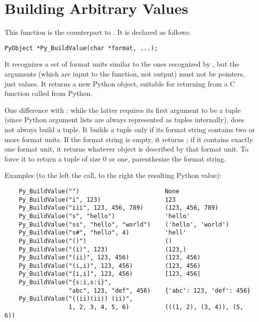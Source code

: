 \section{Building Arbitrary Values
         \label{buildValue}}

This function is the counterpart to .  It is
declared as follows:

\begin{verbatim}
PyObject *Py_BuildValue(char *format, ...);
\end{verbatim}

It recognizes a set of format units similar to the ones recognized by
, but the arguments (which are input to the
function, not output) must not be pointers, just values.  It returns a
new Python object, suitable for returning from a C function called
from Python.

One difference with : while the latter
requires its first argument to be a tuple (since Python argument lists
are always represented as tuples internally),
 does not always build a tuple.  It builds
a tuple only if its format string contains two or more format units.
If the format string is empty, it returns ; if it contains
exactly one format unit, it returns whatever object is described by
that format unit.  To force it to return a tuple of size 0 or one,
parenthesize the format string.

Examples (to the left the call, to the right the resulting Python value):

\begin{verbatim}
    Py_BuildValue("")                        None
    Py_BuildValue("i", 123)                  123
    Py_BuildValue("iii", 123, 456, 789)      (123, 456, 789)
    Py_BuildValue("s", "hello")              'hello'
    Py_BuildValue("ss", "hello", "world")    ('hello', 'world')
    Py_BuildValue("s#", "hello", 4)          'hell'
    Py_BuildValue("()")                      ()
    Py_BuildValue("(i)", 123)                (123,)
    Py_BuildValue("(ii)", 123, 456)          (123, 456)
    Py_BuildValue("(i,i)", 123, 456)         (123, 456)
    Py_BuildValue("[i,i]", 123, 456)         [123, 456]
    Py_BuildValue("{s:i,s:i}",
                  "abc", 123, "def", 456)    {'abc': 123, 'def': 456}
    Py_BuildValue("((ii)(ii)) (ii)",
                  1, 2, 3, 4, 5, 6)          (((1, 2), (3, 4)), (5, 6))
\end{verbatim}


